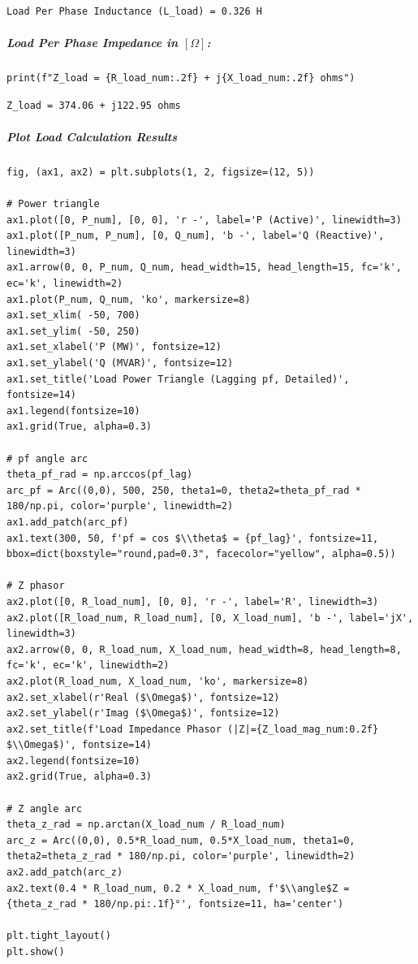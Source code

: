 \begin{verbatim}
Load Per Phase Inductance (L_load) = 0.326 H
\end{verbatim}

\subparagraph{Load Per Phase Impedance in $\left[\Omega\right]$:}

\begin{verbatim}
print(f"Z_load = {R_load_num:.2f} + j{X_load_num:.2f} ohms")
\end{verbatim}

\begin{verbatim}
Z_load = 374.06 + j122.95 ohms
\end{verbatim}

\subparagraph{Plot Load Calculation Results}

\begin{verbatim}
fig, (ax1, ax2) = plt.subplots(1, 2, figsize=(12, 5))

# Power triangle
ax1.plot([0, P_num], [0, 0], 'r -', label='P (Active)', linewidth=3)
ax1.plot([P_num, P_num], [0, Q_num], 'b -', label='Q (Reactive)', linewidth=3)
ax1.arrow(0, 0, P_num, Q_num, head_width=15, head_length=15, fc='k', ec='k', linewidth=2)
ax1.plot(P_num, Q_num, 'ko', markersize=8)
ax1.set_xlim( -50, 700)
ax1.set_ylim( -50, 250)
ax1.set_xlabel('P (MW)', fontsize=12)
ax1.set_ylabel('Q (MVAR)', fontsize=12)
ax1.set_title('Load Power Triangle (Lagging pf, Detailed)', fontsize=14)
ax1.legend(fontsize=10)
ax1.grid(True, alpha=0.3)

# pf angle arc
theta_pf_rad = np.arccos(pf_lag)
arc_pf = Arc((0,0), 500, 250, theta1=0, theta2=theta_pf_rad * 180/np.pi, color='purple', linewidth=2)
ax1.add_patch(arc_pf)
ax1.text(300, 50, f'pf = cos $\\theta$ = {pf_lag}', fontsize=11, bbox=dict(boxstyle="round,pad=0.3", facecolor="yellow", alpha=0.5))

# Z phasor
ax2.plot([0, R_load_num], [0, 0], 'r -', label='R', linewidth=3)
ax2.plot([R_load_num, R_load_num], [0, X_load_num], 'b -', label='jX', linewidth=3)
ax2.arrow(0, 0, R_load_num, X_load_num, head_width=8, head_length=8, fc='k', ec='k', linewidth=2)
ax2.plot(R_load_num, X_load_num, 'ko', markersize=8)
ax2.set_xlabel(r'Real ($\Omega$)', fontsize=12)
ax2.set_ylabel(r'Imag ($\Omega$)', fontsize=12)
ax2.set_title(f'Load Impedance Phasor (|Z|={Z_load_mag_num:0.2f} $\\Omega$)', fontsize=14)
ax2.legend(fontsize=10)
ax2.grid(True, alpha=0.3)

# Z angle arc
theta_z_rad = np.arctan(X_load_num / R_load_num)
arc_z = Arc((0,0), 0.5*R_load_num, 0.5*X_load_num, theta1=0, theta2=theta_z_rad * 180/np.pi, color='purple', linewidth=2)
ax2.add_patch(arc_z)
ax2.text(0.4 * R_load_num, 0.2 * X_load_num, f'$\\angle$Z = {theta_z_rad * 180/np.pi:.1f}°', fontsize=11, ha='center')

plt.tight_layout()
plt.show()
\end{verbatim}


